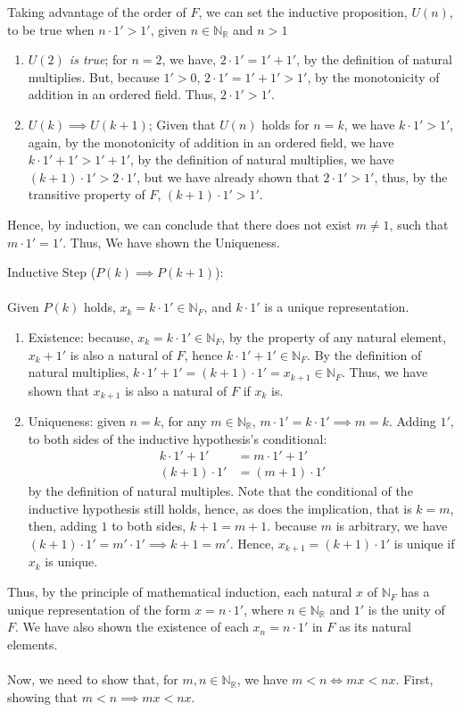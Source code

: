 \documentclass[12pt]{book}
\theoremstyle{definition}
\begin{document}
\begin{sol}
\begin{enumerate}[label=$\bullet$]
	Taking advantage of the order of $F$, we can set the inductive proposition, $U(n)$, to be true when $n\cdot 1' >1'$, given $n \in \mathbb{N}_{\mathbb{R}}$ and $n>1$
		\begin{enumerate}[label=(\roman*)]
			\item \textit{$U(2)$ is true}; for $n=2$, we have, $2\cdot 1'= 1' +1'$, by the definition of natural multiplies. But, because $1'>0$, $2\cdot 1'= 1'+1'> 1'$, by the monotonicity of addition in an ordered field. Thus, $2\cdot 1'>1'$.
			\item $U(k)\implies U(k+1)$; Given that $U(n)$ holds for $n=k$, we have $k\cdot 1'>1'$, again, by the monotonicity of addition in an ordered field, we have $k\cdot 1'+1'>1'+1'$, by the definition of natural multiplies, we have $(k+1)\cdot 1'>2\cdot 1'$, but we have already shown that $2\cdot 1' > 1'$, thus, by the transitive property of $F$, $(k+1)\cdot 1'>1'$.
		\end{enumerate}
		Hence, by induction, we can conclude that there does not exist $m\neq 1$, such that $m\cdot 1'=1'$. Thus, We have shown the Uniqueness.   
\end{enumerate}
Inductive Step ($P(k)\implies P(k+1)$):\\
\\
Given $P(k)$ holds, $x_k = k\cdot 1' \in \mathbb{N}_F$, and $k\cdot 1'$ is a unique representation.
\begin{enumerate}[label=$\bullet$]
	\item Existence: because, $x_k = k\cdot 1' \in \mathbb{N}_{F}$, by the property of any natural element, $x_k+1'$ is also a natural of $F$, hence $k\cdot 1'+1' \in \mathbb{N}_F$. By the definition of natural multiplies, $k\cdot 1'+1' = (k+1)\cdot 1' = x_{k+1} \in \mathbb{N}_F$. Thus, we have shown that $x_{k+1}$ is also a natural of $F$ if $x_k$ is.
	\item Uniqueness: given $n=k$, for any $m\in \mathbb{N}_{\mathbb{R}}$, $m\cdot 1' = k\cdot 1' \implies m=k$. Adding $1'$, to both sides of the inductive hypothesis's conditional:
		\begin{align*}
			k\cdot 1' +1' &= m\cdot 1' +1'\\
			(k+1)\cdot 1' &= (m+1)\cdot 1'  	
		\end{align*}
		by the definition of natural multiples. Note that the conditional of the inductive hypothesis still holds, hence, as does the implication, that is $k=m$, then, adding $1$ to both sides, $k+1= m+1$. because $m$ is arbitrary, we have $(k+1)\cdot 1' = m'\cdot 1' \implies k+1=m'$. Hence, $x_{k+1}=(k+1)\cdot 1'$ is unique if $x_k$ is unique.     	
\end{enumerate}
Thus, by the principle of mathematical induction, each natural $x$ of $\mathbb{N}_F$ has a unique representation of the form $x=n\cdot 1'$, where $n \in \mathbb{N}_{\mathbb{R}} $ and $1'$ is the unity of $F$. We have also shown the existence of each $x_n = n\cdot 1'$ in $F$ as its natural elements.\\ 
\\
Now, we need to show that, for $m,n \in \mathbb{N}_{\mathbb{R}}$, we have $m<n \iff mx<nx$. First, showing that $m<n \implies mx < nx$.
\end{sol} 
\end{document}

